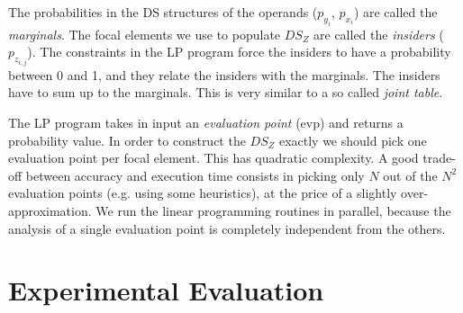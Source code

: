 %
The probabilities in the DS structures of the operands ($p_{y_i}$, $p_{x_i}$) are called the \emph{marginals}. The focal elements we use to populate $DS_Z$ are called the \emph{insiders} ($p_{z_{i,j}}$).
%
The constraints in the LP program force the insiders to have a probability between 0 and 1, and they relate the insiders with the marginals. The insiders have to sum up to the marginals. This is very similar to a so called \emph{joint table}.
%

The LP program takes in input an \emph{evaluation point} (evp) and returns a probability value.
%
In order to construct the $DS_Z$ exactly we should pick one evaluation point per focal element. This has quadratic complexity.
%
A good trade-off between accuracy and execution time consists in picking only $N$ out of the $N^2$ evaluation points (e.g. using some heuristics), at the price of a slightly over-approximation.
%
We run the linear programming routines in parallel, because the analysis of a single evaluation point is completely independent from the others.
%

\section{Experimental Evaluation}
\label{sec:appdx-evaluation}



%
%
%
%
%

